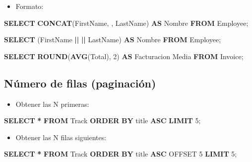 \documentclass[
]{book}
\newenvironment{Shaded}{\begin{snugshade}}{\end{snugshade}}
\newcommand{\DecValTok}[1]{\textcolor[rgb]{0.00,0.00,0.81}{#1}}
\newcommand{\FunctionTok}[1]{\textcolor[rgb]{0.13,0.29,0.53}{\textbf{#1}}}
\newcommand{\KeywordTok}[1]{\textcolor[rgb]{0.13,0.29,0.53}{\textbf{#1}}}
\newcommand{\NormalTok}[1]{#1}
\newcommand{\OperatorTok}[1]{\textcolor[rgb]{0.81,0.36,0.00}{\textbf{#1}}}
\newcommand{\StringTok}[1]{\textcolor[rgb]{0.31,0.60,0.02}{#1}}
\providecommand{\tightlist}{%
  \setlength{\itemsep}{0pt}\setlength{\parskip}{0pt}}
\theoremstyle{break}
\theoremstyle{nonumberplain}
\begin{document}
\begin{itemize}
\tightlist
\item
  Formato:
\end{itemize}

\begin{Shaded}
\begin{Highlighting}[]
  \KeywordTok{SELECT} \FunctionTok{CONCAT}\NormalTok{(FirstName, }\StringTok{\textquotesingle{} \textquotesingle{}}\NormalTok{, LastName) }\KeywordTok{AS}\NormalTok{ Nombre }\KeywordTok{FROM}\NormalTok{ Employee; }

  \KeywordTok{SELECT}\NormalTok{ (FirstName }\OperatorTok{||} \StringTok{\textquotesingle{} \textquotesingle{}} \OperatorTok{||}\NormalTok{ LastName) }\KeywordTok{AS}\NormalTok{ Nombre }\KeywordTok{FROM}\NormalTok{ Employee; }

  \KeywordTok{SELECT} \FunctionTok{ROUND}\NormalTok{(}\FunctionTok{AVG}\NormalTok{(Total), }\DecValTok{2}\NormalTok{) }\KeywordTok{AS} \StringTok{\textquotesingle{}Facturacion Media\textquotesingle{}} \KeywordTok{FROM}\NormalTok{ Invoice; }
\end{Highlighting}
\end{Shaded}

\subsection{Número de filas (paginación)}\label{nuxfamero-de-filas-paginaciuxf3n}

\begin{itemize}
\tightlist
\item
  Obtener las N primeras:
\end{itemize}

\begin{Shaded}
\begin{Highlighting}[]
  \KeywordTok{SELECT} \OperatorTok{*} \KeywordTok{FROM}\NormalTok{ Track}
  \KeywordTok{ORDER} \KeywordTok{BY}\NormalTok{ title }\KeywordTok{ASC}
  \KeywordTok{LIMIT} \DecValTok{5}\NormalTok{;}
\end{Highlighting}
\end{Shaded}

\begin{itemize}
\tightlist
\item
  Obtener las N filas siguientes:
\end{itemize}

\begin{Shaded}
\begin{Highlighting}[]
  \KeywordTok{SELECT} \OperatorTok{*} \KeywordTok{FROM}\NormalTok{ Track}
  \KeywordTok{ORDER} \KeywordTok{BY}\NormalTok{ title }\KeywordTok{ASC}
\NormalTok{  OFFSET }\DecValTok{5} \KeywordTok{LIMIT} \DecValTok{5}\NormalTok{;}
\end{Highlighting}
\end{Shaded}
\end{document}
